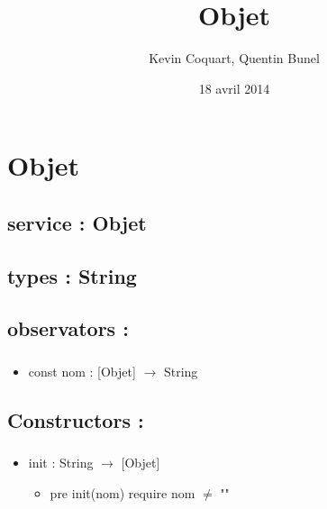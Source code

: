 \documentclass[11pt]{article}
\title{Objet}
\author{Kevin Coquart, Quentin Bunel}
\date{18 avril 2014}
\begin{document}
\maketitle

\setcounter{tocdepth}{3}
\tableofcontents
\vspace*{1cm}
\section{Objet}
\label{sec-1}

\subsection{service : Objet}
\label{sec-1.1}

\subsection{types : String}
\label{sec-1.2}



\subsection{observators :}
\label{sec-1.3}

\subsubsection{}

\begin{itemize}

\item const nom : [Objet] $\to$ String\\
\label{sec-1.3.1.1}



\end{itemize} %
\subsection{Constructors :}
\label{sec-1.4}

\subsubsection{}

\begin{itemize}

\item init : String $\to$ [Objet]\\
\label{sec-1.4.1.1}

\begin{itemize}

\item pre init(nom) require nom $\neq$ ""\\
\label{sec-1.4.1.1.1}



\end{itemize} %
\end{itemize} %
\end{document}
